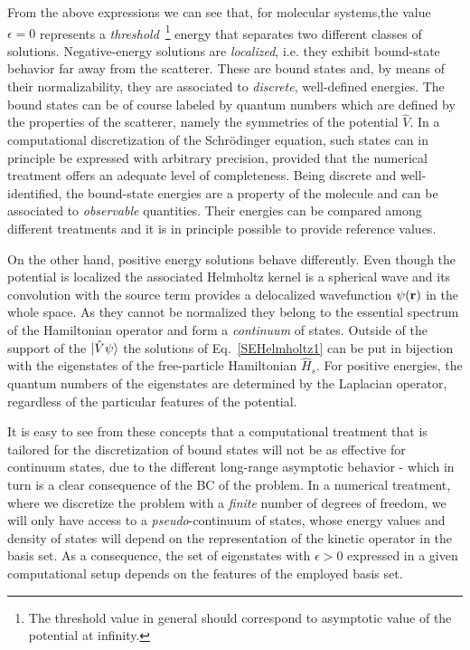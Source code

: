 \documentclass[reprint,aps,prb]{revtex4-1}
\renewcommand{\r}{{\bf r}}
\newcommand{\op}[1]{\hat {#1}}
\begin{document}
From the above expressions we can see that, for molecular systems,the value $\epsilon=0$
represents a \emph{threshold}~\footnote{The threshold value in general should correspond to asymptotic value of the potential at infinity.}
energy that separates two different classes of solutions.
Negative-energy solutions are \emph{localized}, i.e. they exhibit bound-state behavior far away from the scatterer.
These are bound states and, by means of their normalizability, they are associated to \emph{discrete}, well-defined energies.
The bound states can be of course labeled by quantum numbers which are defined by the properties of the scatterer, namely the
symmetries of the potential $\op V$.
In a computational discretization of the Schr\"odinger equation, such states can in principle be expressed with arbitrary precision,
provided that the numerical treatment offers an adequate level of completeness.
Being discrete and well-identified, the bound-state energies are a property of the molecule and can be associated to \emph{observable}
quantities. Their energies can be compared among different treatments and it is in principle possible to
provide reference values.

On the other hand, positive energy solutions behave differently. Even though the potential is localized the associated Helmholtz kernel is a spherical wave and its convolution with the source term provides a delocalized wavefunction $\psi(\r)$ in the whole space.
As they cannot be normalized they belong to the essential spectrum of the Hamiltonian operator and form a \emph{continuum} of states.
Outside of the support of the $\ket{\op V \psi}$ the solutions of Eq.~\eqref{SEHelmholtz1} can be put in bijection with the eigenstates of the
free-particle Hamiltonian $\op H_s$. For positive energies, the quantum numbers of the eigenstates are determined by the Laplacian operator,
regardless of the particular features of the potential.

It is easy to see from these concepts that a computational treatment that is tailored for the discretization of bound states
will not be as effective for continuum states, due to the different long-range asymptotic behavior - which in turn is a clear consequence of the
BC of the problem. In a numerical treatment, where we discretize the problem with a \emph{finite}
number of degrees of freedom, we will only have access to a \emph{pseudo}-continuum of states,
whose energy values and density of states will depend on the representation of the kinetic operator
in the basis set. As a consequence, the set of eigenstates with $\epsilon > 0$ expressed in a given computational setup depends on the features of the employed basis set.
\end{document}

